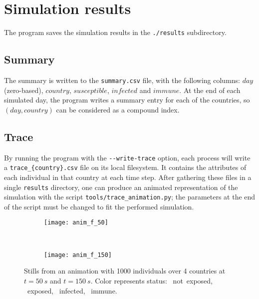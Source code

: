 \section{Simulation results}
\label{sec:sim_res}

The program saves the simulation results in the \texttt{./results} subdirectory.

\subsection{Summary}
The summary is written to the \texttt{summary.csv} file, with the following columns: $day$ (zero-based), $country$, $susceptible$, $infected$ and $immune$.
At the end of each simulated day, the program writes a summary entry for each of the countries, so $(day, country)$ can be considered as a compound index.

\subsection{Trace}
By running the program with the \verb!--write-trace! option, each process will write a \texttt{trace\_\{country\}.csv} file on its local filesystem. It contains the attributes of each individual in that country at each time step.
After gathering these files in a single \texttt{results} directory, one can produce an animated representation of the simulation with the script \texttt{tools/trace\_animation.py}; the parameters at the end of the script must be changed to fit the performed simulation.

\begin{figure}[hb]
    \begin{subfigure}[c]{0.49\textwidth}
        \texttt{[image: anim\_f\_50]}
    \end{subfigure}
    ~
    \begin{subfigure}[c]{0.49\textwidth}
        \texttt{[image: anim\_f\_150]}
    \end{subfigure}
    \caption{Stills from an animation with 1000 individuals over 4 countries at $t=\SI{50}{s}$ and $t=\SI{150}{s}$. Color represents status:
    \textcolor{plt:green}{\circmark}~not~exposed,
    \textcolor{plt:yellow}{\circmark}~exposed,
    \textcolor{plt:red}{\circmark}~infected,
    \textcolor{plt:blue}{\circmark}~immune.
    }
    \label{fig:animation}
\end{figure}